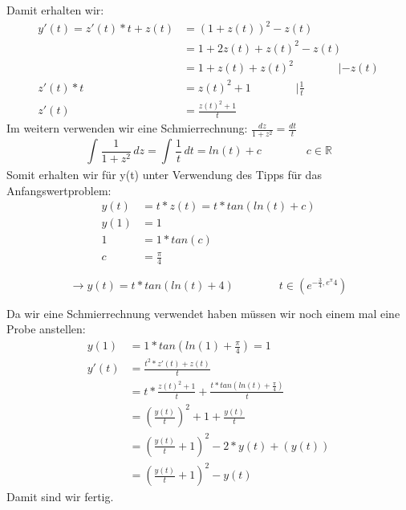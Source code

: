 \documentclass{article}
\newcommand{\tab}{\qquad \qquad}
\begin{document}
Damit erhalten wir:
\begin{align*}
    y'(t) = z'(t) * t + z(t) &= (1 + z(t))^2 - z(t) \\ 
                             &= 1 + 2z(t) + z(t)^2 - z(t) \\ 
                             &= 1 + z(t) + z(t)^2 \tab | -z(t) \\ 
                      z'(t) * t &= z(t)^2 + 1 \tab | \frac{1}{t} \\ 
                      z'(t) &= \frac{z(t)^2 + 1}{t}
\end{align*}
Im weitern verwenden wir eine Schmierrechnung:
$\frac{dz}{1 + z^2} = \frac{dt}{t}$
\[
    \int_{}^{} \frac{1}{1 + z^2} \, dz = \int_{}^{} \frac{1}{t} \, dt = ln(t) + c \tab c \in \mathds{R}
\]
Somit erhalten wir für y(t) unter Verwendung des Tipps für das Anfangswertproblem:
\begin{align*}
    y(t) &= t * z(t) = t * tan(ln(t) + c) \\  
    y(1) &= 1 \\ 
    1 &= 1 * tan(c) \\ 
    c &= \frac{\pi}{4}
\end{align*}

\[
    \rightarrow y(t) = t * tan(ln(t) + 4) \tab t \in (e^{-\frac{3}{4}, e^{\pi}{4}})
\]

\noindent Da wir eine Schmierrechnung verwendet haben müssen wir noch einem mal eine Probe anstellen:
\begin{align*}
    y(1) &= 1 * tan(ln(1) + \frac{\pi}{4}) = 1 \\ 
    y'(t) &= \frac{t^2 * z'(t) + z(t)}{t} \\ 
          &= t * \frac{z(t)^2 + 1}{t} + \frac{t * tan(ln(t) + \frac{\pi}{4})}{t} \\ 
          &= (\frac{y(t)}{t})^2 + 1 + \frac{y(t)}{t} \\ 
          &= (\frac{y(t)}{t} + 1)^2 - 2 * y(t) + (y(t)) \\ 
          &= (\frac{y(t)}{t} + 1)^2 - y(t) 
\end{align*}
Damit sind wir fertig.
\end{document}
